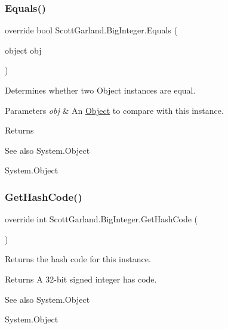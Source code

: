 \subsubsection{\texorpdfstring{Equals()}{Equals()}}
{\footnotesize\ttfamily override bool Scott\+Garland.\+Big\+Integer.\+Equals (\begin{DoxyParamCaption}\item[{object}]{obj }\end{DoxyParamCaption})\hspace{0.3cm}{\ttfamily [inline]}}



Determines whether two Object instances are equal. 


\begin{DoxyParams}{Parameters}
{\em obj} & An \hyperlink{}{Object} to compare with this instance.\\
\hline
\end{DoxyParams}
\begin{DoxyReturn}{Returns}

\end{DoxyReturn}
\begin{DoxySeeAlso}{See also}
System.\+Object


\end{DoxySeeAlso}
System.\+Object\mbox{\label{class_scott_garland_1_1_big_integer_a8437c07ab30cda55c559bf17f4466ead}} 
\subsubsection{\texorpdfstring{Get\+Hash\+Code()}{GetHashCode()}}
{\footnotesize\ttfamily override int Scott\+Garland.\+Big\+Integer.\+Get\+Hash\+Code (\begin{DoxyParamCaption}{ }\end{DoxyParamCaption})\hspace{0.3cm}{\ttfamily [inline]}}



Returns the hash code for this instance. 

\begin{DoxyReturn}{Returns}
A 32-\/bit signed integer has code.
\end{DoxyReturn}
\begin{DoxySeeAlso}{See also}
System.\+Object


\end{DoxySeeAlso}
System.\+Object\mbox{\label{class_scott_garland_1_1_big_integer_a21e007e5a3c6fdd5c1fbd7daa41e9f8c}} 
